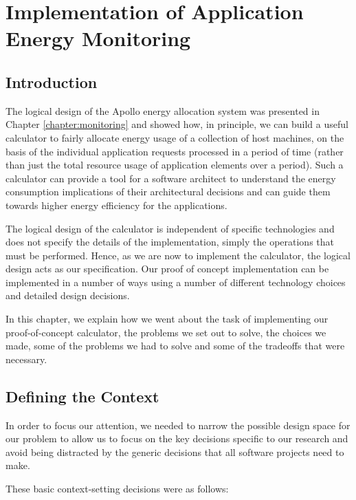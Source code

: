 \chapter{Implementation of Application Energy Monitoring}
\label{chapter:implementation}

\section{Introduction}
The logical design of the Apollo energy allocation system was presented in Chapter \ref{chapter:monitoring} and showed how, in principle, we can build a useful calculator to fairly allocate energy usage of a collection of host machines, on the basis of the individual application requests processed in a period of time (rather than just the total resource usage of application elements over a period).   Such a calculator can provide a tool for a software architect to understand the energy consumption implications of their architectural decisions and can guide them towards higher energy efficiency for the applications.

The logical design of the calculator is independent of specific technologies and does not specify the details of the implementation, simply the operations that must be performed.  Hence, as we are now to implement the calculator, the logical design acts as our specification.  Our proof of concept implementation can be implemented in a number of ways using a number of different technology choices and detailed design decisions.

In this chapter, we explain how we went about the task of implementing our proof-of-concept calculator, the problems we set out to solve, the choices we made, some of the problems we had to solve and some of the tradeoffs that were necessary.

\section{Defining the Context}

In order to focus our attention, we needed to narrow the possible design space for our problem to allow us to focus on the key decisions specific to our research and avoid being distracted by the generic decisions that all software projects need to make.

These basic context-setting decisions were as follows:

